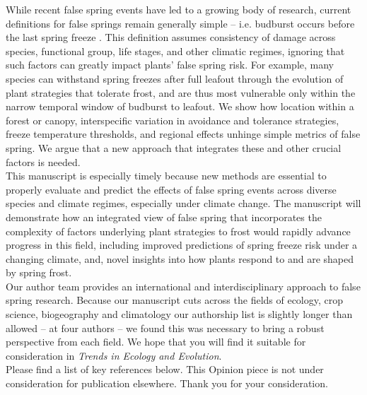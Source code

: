 \documentclass[11pt,a4paper]{article}\usepackage[]{graphicx}\usepackage[]{color}
\begin{document}
\noindent While recent false spring events have led to a growing body of research, current definitions for false springs remain generally simple -- i.e. budburst occurs before the last spring freeze \citep{Gu2008}. This definition assumes consistency of damage across species, functional group, life stages, and other climatic regimes, ignoring that such factors can greatly impact plants' false spring risk. For example, many species can withstand spring freezes after full leafout through the evolution of plant strategies that tolerate frost, and are thus most vulnerable only within the narrow temporal window of budburst to leafout. We show how location within a forest or canopy, interspecific variation in avoidance and tolerance strategies, freeze temperature thresholds, and regional effects unhinge simple metrics of false spring. We argue that a new approach that integrates these and other crucial factors is needed.  \\

\noindent This manuscript is especially timely because new methods are essential to properly evaluate and predict the effects of false spring events across diverse species and climate regimes, especially under climate change. The manuscript will demonstrate how an integrated view of false spring that incorporates the complexity of factors underlying plant strategies to frost would rapidly advance progress in this field, including improved predictions of spring freeze risk under a changing climate, and, novel insights into how plants respond to and are shaped by spring frost. \\

\noindent Our author team provides an international and interdisciplinary approach to false spring research. Because our manuscript cuts across the fields of ecology, crop science, biogeography and climatology our authorship list is slightly longer than allowed -- at four authors -- we found this was necessary to bring a robust perspective from each field. We hope that you will find it suitable for consideration in \textit{Trends in Ecology and Evolution}. \\

\noindent Please find a list of key references below. This Opinion piece is not under consideration for publication elsewhere. Thank you for your consideration. \\
\end{document}
